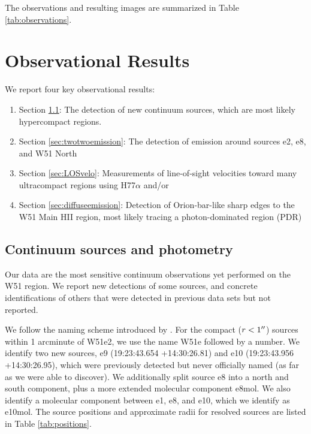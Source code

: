The observations and resulting images are summarized in Table
\ref{tab:observations}.



\section{Observational Results}
We report four key observational results: 
\begin{enumerate}
    \item Section \ref{sec:pointsources}: The detection of new continuum
        sources, which are most likely hypercompact \hii regions. 
    \item Section \ref{sec:twotwoemission}: The detection of \formaldehyde
        \twotwo emission around sources e2, e8, and W51 North
    \item Section \ref{sec:LOSvelo}: Measurements of line-of-sight velocities
        toward many ultracompact \hii regions using H77$\alpha$ and/or
        \formaldehyde
    \item Section \ref{sec:diffuseemission}: Detection of Orion-bar-like sharp
        edges to the W51 Main HII region, most likely tracing a
        photon-dominated region (PDR)
\end{enumerate}

\subsection{Continuum sources and photometry}
\label{sec:pointsources}
Our data are the most sensitive continuum observations yet performed on the W51
region.  We report new detections of some sources, and concrete identifications
of others that were detected in previous data sets but not reported.

We follow the naming scheme introduced by \citet{Mehringer1994a}.  For the
compact ($r<1\mbox{$^{\prime\prime}$}$) sources within 1 arcminute of W51e2, we use the name
W51e followed by a number.  We identify two new sources, e9 (19:23:43.654
+14:30:26.81) and e10 (19:23:43.956 +14:30:26.95), which were previously
detected but never officially named (as far as we were able to discover).
We additionally split source e8 into a north and south component, plus a more
extended molecular component e8mol.  We also identify a molecular component
between e1, e8, and e10, which we identify as e10mol.  The source positions
and approximate radii for resolved sources are listed in Table
\ref{tab:positions}.

